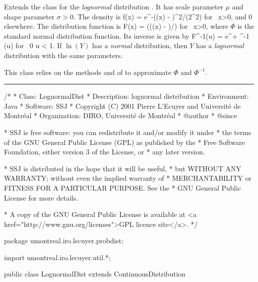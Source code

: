 
Extends the class  for the
{\em lognormal\/} distribution  \cite{tJOH95a}. It has scale
parameter $\mu$ and shape parameter $\sigma > 0$.
The density is
\eq
  f(x) = 
      e^{-(\ln (x) - \mu)^2/(2\sigma^2)}
      \qquad\mbox{for }  x>0,                   
\endeq
and 0 elsewhere.  The distribution function is
\eq
  F(x) = \Phi \left({(\ln(x) - \mu)/\sigma}\right) \qquad\mbox{for }  x>0,
\endeq
where $\Phi$ is the standard normal distribution function.
Its inverse is given by
\eq
    F^{-1}(u) = e^{\mu + \sigma\Phi^{-1} (u)}
          \qquad \mbox{for } 0 \le u < 1.
\endeq
If $\ln(Y)$ has a {\em normal\/} distribution, then $Y$ has a
{\em lognormal\/} distribution with the same parameters.

This class relies on the methods
   and
of  to approximate $\Phi$ and $\Phi^{-1}$.


\bigskip\hrule

\begin{code}
\begin{hide}
/*
 * Class:        LognormalDist
 * Description:  lognormal distribution
 * Environment:  Java
 * Software:     SSJ 
 * Copyright (C) 2001  Pierre L'Ecuyer and Université de Montréal
 * Organization: DIRO, Université de Montréal
 * @author       
 * @since

 * SSJ is free software: you can redistribute it and/or modify it under
 * the terms of the GNU General Public License (GPL) as published by the
 * Free Software Foundation, either version 3 of the License, or
 * any later version.

 * SSJ is distributed in the hope that it will be useful,
 * but WITHOUT ANY WARRANTY; without even the implied warranty of
 * MERCHANTABILITY or FITNESS FOR A PARTICULAR PURPOSE.  See the
 * GNU General Public License for more details.

 * A copy of the GNU General Public License is available at
   <a href="http://www.gnu.org/licenses">GPL licence site</a>.
 */
\end{hide}
package umontreal.iro.lecuyer.probdist;
\begin{hide}
import umontreal.iro.lecuyer.util.*;\end{hide}

public class LognormalDist extends ContinuousDistribution\begin{hide} {
   private double mu;
   private double sigma; \end{hide}
\end{code}
